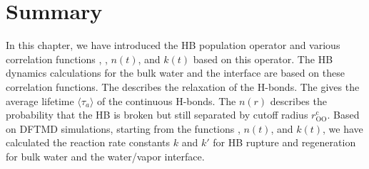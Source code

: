 
\section{Summary}
In this chapter, we have introduced the HB population operator and various correlation functions \CHB, \SHB, $n(t)$, and $k(t)$ based on this operator. 
The HB dynamics calculations for the bulk water and the interface are based on these correlation functions. 
The \CHB describes the relaxation of the H-bonds. The \SHB gives the average lifetime $\langle \tau_a \rangle$ of the continuous H-bonds. 
The $n(r)$ describes the probability that the HB is broken but still separated by cutoff radius $r_\text{OO}^\text{c}$. 
Based on DFTMD simulations, starting from the functions \CHB, $n(t)$, and $k(t)$, 
we have calculated the reaction rate constants $k$ and $k'$ for HB rupture and regeneration for bulk water and the water/vapor interface.


